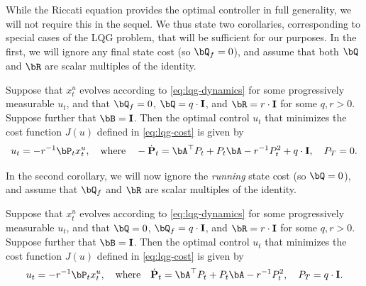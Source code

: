 While the Riccati equation provides the optimal controller in full generality, we will not require this in the sequel.  We thus state two corollaries, corresponding to special cases of the LQG problem, that will be sufficient for our purposes.  In the first, we will ignore any final state cost (so $\bQ_f = 0$), and assume that both $\bQ$ and $\bR$ are scalar multiples of the identity.
\begin{corollary}\label{cor:lqg-scalarcost}
    Suppose that $x_t^u$ evolves according to \eqref{eq:lqg-dynamics} for some progressively measurable $u_t$, and that $\bQ_f = 0$, $\bQ = q \cdot \eye$, and $\bR = r \cdot \eye$ for some $q, r > 0$.  Suppose further that $\bB = \eye$.  Then the optimal control $u_t$ that minimizes the cost function $J(u)$ defined in \eqref{eq:lqg-cost} is given by
    \begin{align}
        u_t = - r^{-1} \bP_t x_t^u, \quad \text{where} \quad - \bPdot_t = \bA^\top P_t + P_t \bA - r^{-1} P_t^2 + q \cdot \eye, \quad P_T = 0.
    \end{align}
\end{corollary}


In the second corollary, we will now ignore the \emph{running} state cost (so $\bQ = 0$), and assume that $\bQ_f$ and $\bR$ are scalar multiples of the identity.
\begin{corollary}\label{cor:lqg-finalcost}
    Suppose that $x_t^u$ evolves according to \eqref{eq:lqg-dynamics} for some progressively measurable $u_t$, and that $\bQ = 0$, $\bQ_f = q \cdot \eye$, and $\bR = r \cdot \eye$ for some $q, r > 0$.  Suppose further that $\bB = \eye$.  Then the optimal control $u_t$ that minimizes the cost function $J(u)$ defined in \eqref{eq:lqg-cost} is given by
    \begin{align}
        u_t = - r^{-1} \bP_t x_t^u, \quad \text{where} \quad  \bPdot_t = \bA^\top P_t + P_t \bA - r^{-1} P_t^2, \quad P_T = q \cdot \eye.
    \end{align}
\end{corollary}

